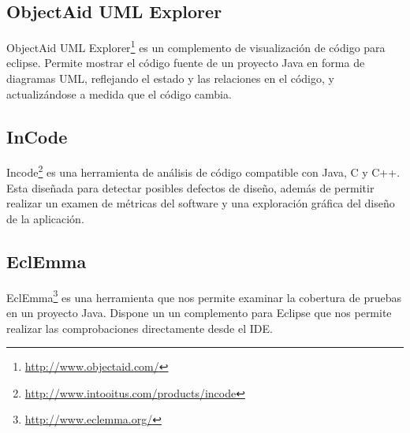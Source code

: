 \subsection{ObjectAid UML Explorer}
ObjectAid UML Explorer\footnote{\url{http://www.objectaid.com/}} es un complemento de visualización de código para eclipse.
Permite mostrar el código fuente de un proyecto Java en forma de diagramas UML, reflejando el estado y las relaciones en el código, y actualizándose a medida que el código cambia.

\subsection{InCode}
Incode\footnote{\url{http://www.intooitus.com/products/incode}} es una herramienta de análisis de código compatible con Java, C y C++.
Esta diseñada para detectar posibles defectos de diseño, además de permitir realizar un examen de métricas del software y una exploración gráfica del diseño de la aplicación.

\subsection{EclEmma}
EclEmma\footnote{\url{http://www.eclemma.org/}} es una herramienta que nos permite examinar la cobertura de pruebas en un proyecto Java.
Dispone un un complemento para Eclipse que nos permite realizar las comprobaciones directamente desde el IDE.